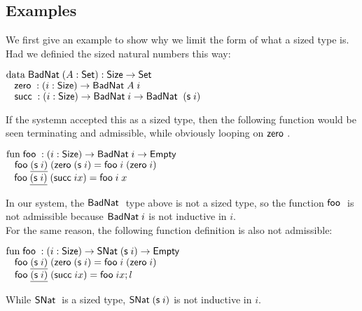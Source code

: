 \subsection{Examples}
We first give an example to show why we limit the form of what a sized type is.
Had we definied the sized natural numbers this way:
\begin{bsp}
$\data \BadNat ( A : \Set ) : \Size \ra \Set $ \\
$\spc \zero : \EPi{i}{\Size}{ \BadNat A \; i} $\\
$\spc \suc : \EPi{i}{\Size}{\BadNat i \ra \BadNat \; (\s i)} $
\end{bsp}
If the systemn accepted this as a sized type, then the following function would be seen terminating and admissible, while obviously looping on $\zero$.
\begin{bsp}
$\fun \foo : \EPi{i}{\Size}{\BadNat i \ra \Empty}$\\
$\spc \foo \inacc{(\s i)} \; (\zero (\s i) = \foo i \; (\zero i)$\\
$\spc \foo \inacc{(\s i)}\; (\suc i x) = \foo i \; x$
\end{bsp}
In our system, the $\BadNat$ type above is not a sized type, so the function $\foo$ is not admissible because $\BadNat i$ is not inductive in $i$.\\
For the same reason, the following function definition is also not admissible:
\begin{bsp}
$\fun \foo : \EPi{i}{\Size}{\SNat (\s i) \ra \Empty}$\\
$\spc \foo \inacc{(\s i)} \; (\zero (\s i) = \foo i \; (\zero i)$\\
$\spc \foo \inacc{(\s i)}\; (\suc i x) = \foo i x; l$
\end{bsp}
While $\SNat$ is a sized type, $\SNat (\s i)$ is not inductive in $i$.
